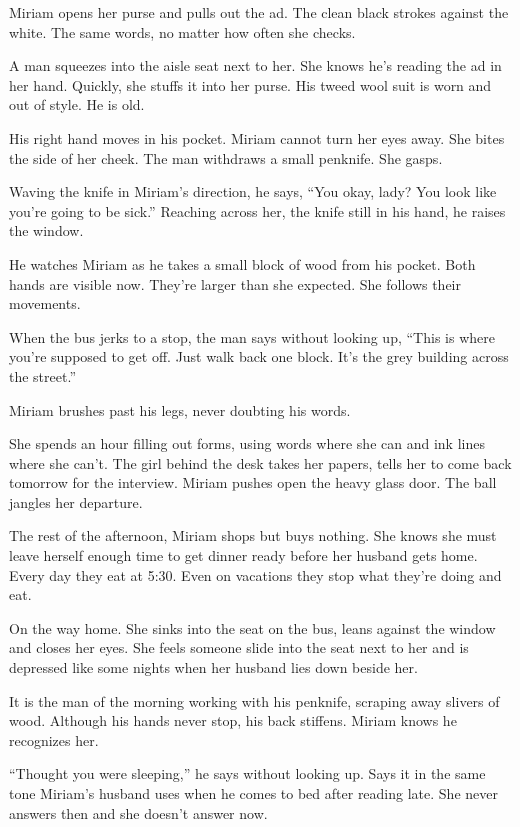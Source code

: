 \documentclass[twoside,10pt]{book}
\begin{document}
Miriam opens her purse and pulls out the ad. The clean black strokes
against the white. The same words, no matter how often she checks.

A man squeezes into the aisle seat next to her. She knows he's reading
the ad in her hand. Quickly, she stuffs it into her purse. His tweed
wool suit is worn and out of style. He is old.

His right hand moves in his pocket. Miriam cannot turn her eyes away.
She bites the side of her cheek. The man withdraws a small penknife. She
gasps.

Waving the knife in Miriam's direction, he says, ``You okay, lady? You
look like you're going to be sick.'' Reaching across her, the knife
still in his hand, he raises the window.

He watches Miriam as he takes a small block of wood from his pocket.
Both hands are visible now. They're larger than she expected. She
follows their movements.

When the bus jerks to a stop, the man says without looking up, ``This is
where you're sup­posed to get off. Just walk back one block. It's the
grey building across the street.''

Miriam brushes past his legs, never doubting his words.

She spends an hour filling out forms, using words where she can and ink
lines where she can't. The girl behind the desk takes her papers, tells
her to come back tomorrow for the interview. Miriam pushes open the
heavy glass door. The ball jangles her departure.

The rest of the afternoon, Miriam shops but buys nothing. She knows she
must leave herself enough time to get dinner ready before her husband
gets home. Every day they eat at 5:30. Even on vacations they stop what
they're doing and eat.

On the way home. She sinks into the seat on the bus, leans against the
window and closes her eyes. She feels someone slide into the seat next
to her and is depressed like some nights when her husband lies down
beside her.

It is the man of the morning working with his penknife, scraping away
slivers of wood. Although his hands never stop, his back stiffens.
Miriam knows he recognizes her.

``Thought you were sleeping,'' he says without looking up. Says it in
the same tone Miriam's husband uses when he comes to bed after reading
late. She never answers then and she doesn't answer now.
\end{document}
